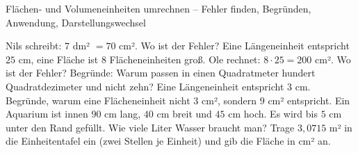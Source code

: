 \begin{aufgabe}{Flächen- und Volumeneinheiten umrechnen – Fehler finden, Begründen, Anwendung, Darstellungswechsel}
\begin{teile}
\teil Nils schreibt: $7$ dm² $= 70$ cm². Wo ist der Fehler?
\teil Eine Längeneinheit entspricht $25$ cm, eine Fläche ist $8$ Flächeneinheiten groß. Ole rechnet: $8 \cdot 25 = 200$ cm². Wo ist der Fehler?
\teil Begründe: Warum passen in einen Quadratmeter hundert Quadratdezimeter und nicht zehn?
\teil Eine Längeneinheit entspricht $3$ cm. Begründe, warum eine Flächeneinheit nicht $3$ cm², sondern $9$ cm² entspricht.
\teil Ein Aquarium ist innen $90$ cm lang, $40$ cm breit und $45$ cm hoch. Es wird bis $5$ cm unter den Rand gefüllt. Wie viele Liter Wasser braucht man? \leerfeld[l]
\teil Trage $3{,}0715$ m² in die Einheitentafel ein (zwei Stellen je Einheit) und gib die Fläche in cm² an.

\leerfeld[cm²]
\end{teile}
\end{aufgabe}
